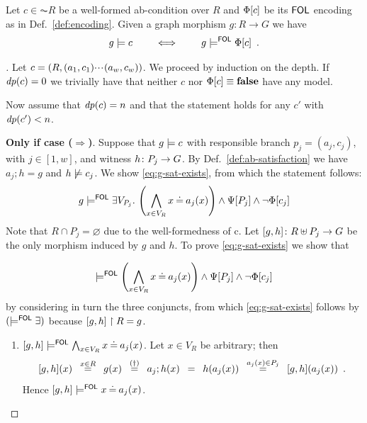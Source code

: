\begin{proposition}
  \label{pr:same-models}
  Let $c\in \AC R$ be a well-formed ab-condition over $R$ and $\Phi[{c}]$ be its $\mathsf{FOL}$ encoding as in Def.~\ref{def:encoding}. Given a graph morphism $g: R \to G$ we have
  \[ g \models c \qquad \iff \qquad g \models^{\mathsf{FOL}} \Phi[{c}]\enspace.\] 
\end{proposition}

\begin{proof}[]
Let $c=(R,(a_1,c_1){\cdotp\mkern-2mu\cdotp\mkern-2mu\cdotp\mkern1mu}(a_w,c_w))$. We proceed by induction on the depth. If $\mathit{dp}(c) = 0$ we trivially have that neither $c$ nor $\Phi[{c}] \equiv \textbf{false}$ have any model.

Now assume that $\mathit{dp}(c) = n$ and that the statement holds for any $c'$ with $\mathit{dp}(c')<n$.

\medskip\noindent
\textbf{Only if case ($\Rightarrow$)}.
%
Suppose that $g \models c$ with responsible branch $p_j = (a_j,c_j)$, with $j \in [1,w]$, and witness $h\colon P_j \rightarrow G$. By Def.~\ref{def:ab-satisfaction} we have \tagone $a_j;h = g$ and \tagtwo $h \not \models c_j$.
%
We show \eqref{eq:g-sat-exists}, from which the statement follows:
%
\begin{equation}
  \label{eq:g-sat-exists}
g\models^{\mathsf{FOL}} \exists V_{P_j}.\, \left(\bigwedge_{x \in V_{R}} x \mathbin{\doteq} a_j(x)\right) \land \Psi[{P_j}] \land  \neg \Phi[{c_j}]
\end{equation}
%
Note that $R\cap P_j = \varnothing$ due to the well-formedness of c. Let $[g,h]\colon R\uplus P_j \rightarrow G$ be the only morphism induced by $g$ and $h$. To prove  \eqref{eq:g-sat-exists} we show that 

\begin{equation}
[g,h] \sat^\FOL \left(\bigwedge_{x \in V_{R}} x \Eq a_j(x) \right) \land \grtofol {P_j} \wedge \neg \tofol {c_j}
\end{equation}
%
by considering in turn the three conjuncts, from which \eqref{eq:g-sat-exists} follows by $(\models^{\mathsf{FOL}} \exists)$ because $[g,h]\restriction R = g$.
\begin{enumerate}  
\item $[g,h] \models^{\mathsf{FOL}} \bigwedge_{x \in V_{R}} x \mathbin{\doteq} a_j(x)$. Let $x \in V_{R}$ be arbitrary; then
%
\[ [g,h](x) \enspace\stackrel{x\in R} =\enspace g(x) \enspace\stackrel{(\dag)} =\enspace a_j;h(x) \enspace=\enspace h(a_j(x)) \enspace\stackrel{a_j(x) \in P_j}=\enspace [g,h](a_j(x)) \enspace. \]
%
Hence $[g,h] \models^{\mathsf{FOL}} x \mathbin{\doteq} a_j(x)$. 


\end{enumerate}
\end{proof}
